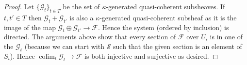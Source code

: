 \documentclass[10pt,a4paper]{amsart}
\theoremstyle{plain}
\theoremstyle{definition}
\theoremstyle{remark}
\numberwithin{equation}{subsection}
\def\colim{\mathop{\mathrm{colim}}\nolimits}
\begin{document}
\begin{proof}
\medskip\noindent
Let $\{\mathcal{G}_t\}_{t \in T}$ be the set of $\kappa$-generated
quasi-coherent subsheaves. If $t, t' \in T$ then
$\mathcal{G}_t + \mathcal{G}_{t'}$ is also a $\kappa$-generated
quasi-coherent subsheaf as it is the image of the map
$\mathcal{G}_t \oplus \mathcal{G}_{t'} \to \mathcal{F}$.
Hence the system (ordered by inclusion) is directed.
The arguments above show that every section of $\mathcal{F}$ over $U_i$
is in one of the $\mathcal{G}_t$ (because we can start with $\mathcal{S}$
such that the given section is an element of $S_i$). Hence
$\colim_t \mathcal{G}_t \to \mathcal{F}$ is both injective and surjective
as desired.
\end{proof}
\end{document}
